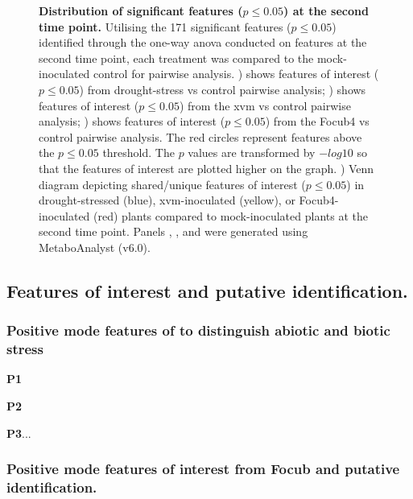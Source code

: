 \begin{figure}[ph!]
\begin{subfigure}[b]{0.49\textwidth}
        \caption{}
        \label{fig:PairwiseVenn-SecondTimePoint}
    \end{subfigure}
    \caption[Distribution of significant features at the second time point.]{\textbf{Distribution of significant features ($p \le0.05$) at the second time point.}
    Utilising the 171 significant features ($p \le0.05$) identified through the one-way \ac{anova} conducted on features at the second time point, each treatment was compared to the mock-inoculated control for pairwise analysis.
    \textbf{}) shows features of interest ($p \le0.05$) from drought-stress vs control pairwise analysis;
    \textbf{}) shows features of interest ($p \le0.05$) from the \acl{xvm} vs control pairwise analysis; 
    \textbf{}) shows features of interest ($p \le0.05$) from the \acl{Focub4} vs control pairwise analysis. The red circles represent features above the $p \le0.05$ threshold. The $p$ values are transformed by $-log10$ so that the features of interest are plotted higher on the graph.
    \textbf{}) Venn diagram depicting shared/unique features of interest ($p \le0.05$) in drought-stressed (blue), \ac{xvm}-inoculated (yellow), or \ac{Focub4}-inoculated (red) plants compared to mock-inoculated plants at the second time point. 
    Panels , , and  were generated using MetaboAnalyst (v6.0).  
    }
    \label{fig:enter-label}
\end{figure}

\subsection{Features of interest and putative identification.}

\subsubsection{Positive mode features of to distinguish abiotic and biotic stress}

\textbf{P1}

\textbf{P2}

\textbf{P3}...

\subsubsection{Positive mode features of interest  from \ac{Focub} and putative identification.}

